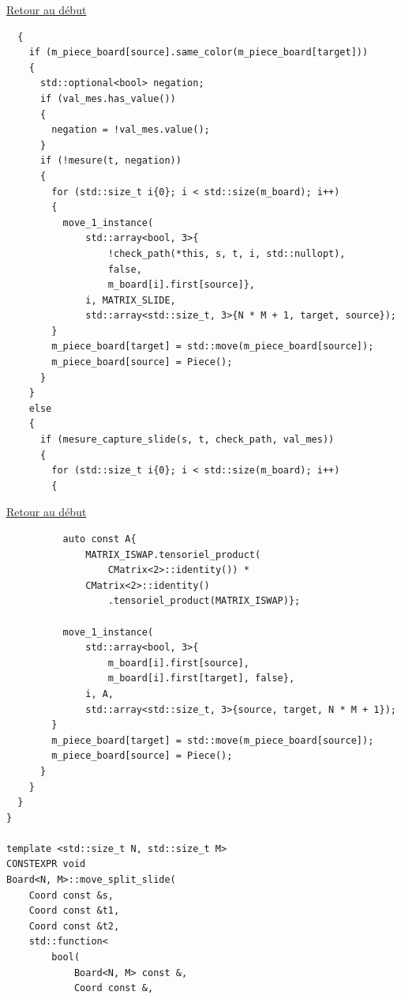 {\begin{frame}[fragile]
\hyperlink{conclusion}{Retour au début}\newline
\begin{verbatim}
  {
    if (m_piece_board[source].same_color(m_piece_board[target]))
    {
      std::optional<bool> negation;
      if (val_mes.has_value())
      {
        negation = !val_mes.value();
      }
      if (!mesure(t, negation))
      {
        for (std::size_t i{0}; i < std::size(m_board); i++)
        {
          move_1_instance(
              std::array<bool, 3>{
                  !check_path(*this, s, t, i, std::nullopt),
                  false,
                  m_board[i].first[source]},
              i, MATRIX_SLIDE,
              std::array<std::size_t, 3>{N * M + 1, target, source});
        }
        m_piece_board[target] = std::move(m_piece_board[source]);
        m_piece_board[source] = Piece();
      }
    }
    else
    {
      if (mesure_capture_slide(s, t, check_path, val_mes))
      {
        for (std::size_t i{0}; i < std::size(m_board); i++)
        {
\end{verbatim}
\end{frame}

\begin{frame}[fragile]
\hyperlink{conclusion}{Retour au début}\newline
\begin{verbatim}
          auto const A{
              MATRIX_ISWAP.tensoriel_product(
                  CMatrix<2>::identity()) *
              CMatrix<2>::identity()
                  .tensoriel_product(MATRIX_ISWAP)};

          move_1_instance(
              std::array<bool, 3>{
                  m_board[i].first[source],
                  m_board[i].first[target], false},
              i, A,
              std::array<std::size_t, 3>{source, target, N * M + 1});
        }
        m_piece_board[target] = std::move(m_piece_board[source]);
        m_piece_board[source] = Piece();
      }
    }
  }
}

template <std::size_t N, std::size_t M>
CONSTEXPR void
Board<N, M>::move_split_slide(
    Coord const &s,
    Coord const &t1,
    Coord const &t2,
    std::function<
        bool(
            Board<N, M> const &,
            Coord const &,
\end{verbatim}
\end{frame}

}
